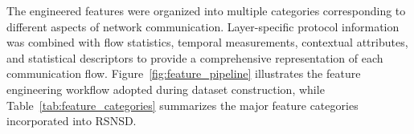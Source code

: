 \documentclass[12pt,a4paper]{report}
\begin{document}
	The engineered features were organized into multiple categories corresponding to different aspects of network communication. Layer-specific protocol information was combined with flow statistics, temporal measurements, contextual attributes, and statistical descriptors to provide a comprehensive representation of each communication flow. Figure~\ref{fig:feature_pipeline} illustrates the feature engineering workflow adopted during dataset construction, while Table~\ref{tab:feature_categories} summarizes the major feature categories incorporated into RSNSD.
	

	
\end{document}
